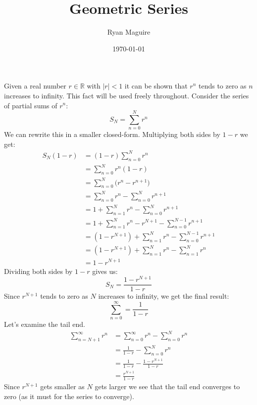 \documentclass{article}
\title{Geometric Series}
\author{Ryan Maguire}
\date{\today}
\theoremstyle{plain}
\theoremstyle{normal}
\begin{document}
    \maketitle
    Given a real number $r\in\mathbb{R}$ with $|r|<1$ it can be shown that
    $r^{n}$ tends to zero as $n$ increases to infinity. This fact will be used
    freely throughout. Consider the series of partial sums of $r^{n}$:
    \begin{equation}
        S_{N}=\sum_{n=0}^{N}r^{n}
    \end{equation}
    We can rewrite this in a smaller closed-form. Multiplying both sides
    by $1-r$ we get:
    \begin{align}
        S_{N}(1-r)
        &=(1-r)\sum_{n=0}^{N}r^{n}\\
        &=\sum_{n=0}^{N}r^{n}(1-r)\\
        &=\sum_{n=0}^{N}\big(r^{n}-r^{n+1}\big)\\
        &=\sum_{n=0}^{N}r^{n}-\sum_{n=0}^{N}r^{n+1}\\
        &=1+\sum_{n=1}^{N}r^{n}-\sum_{n=0}^{N}r^{n+1}\\
        &=1+\sum_{n=1}^{N}r^{n}-r^{N+1}-\sum_{n=0}^{N-1}r^{n+1}\\
        &=(1-r^{N+1})+\sum_{n=1}^{N}r^{n}-\sum_{n=0}^{N-1}r^{n+1}\\
        &=(1-r^{N+1})+\sum_{n=1}^{N}r^{n}-\sum_{n=1}^{N}r^{n}\\
        &=1-r^{N+1}
    \end{align}
    Dividing both sides by $1-r$ gives us:
    \begin{equation}
        S_{N}=\frac{1-r^{N+1}}{1-r}
    \end{equation}
    Since $r^{N+1}$ tends to zero as $N$ increases to infinity, we get the
    final result:
    \begin{equation}
        \sum_{n=0}^{\infty}=\frac{1}{1-r}
    \end{equation}
    Let's examine the tail end.
    \begin{align}
        \sum_{n=N+1}^{\infty}r^{n}
        &=\sum_{n=0}^{\infty}r^{n}-\sum_{n=0}^{N}r^{n}\\
        &=\frac{1}{1-r}-\sum_{n=0}^{N}r^{n}\\
        &=\frac{1}{1-r}-\frac{1-r^{N+1}}{1-r}\\
        &=\frac{r^{N+1}}{1-r}
    \end{align}
    Since $r^{N+1}$ gets smaller as $N$ gets larger we see that the tail
    end converges to zero (as it must for the series to converge).
\end{document}
